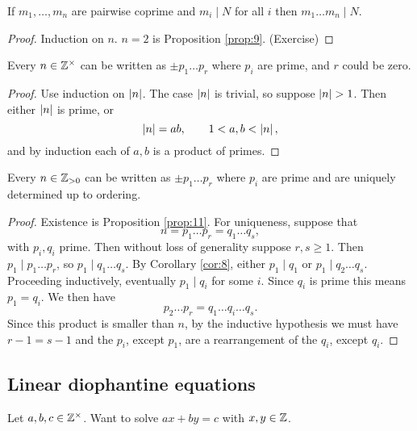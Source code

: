 \begin{corollary}
\label{cor:10}
If $ m_1, \dots, m_n $ are pairwise coprime and $ m_i \mid N $ for all $ i $ then $ m_1 \dots m_n \mid N $.
\end{corollary}

\begin{proof}
Induction on $ n $. $ n = 2 $ is Proposition \ref{prop:9}. (Exercise)
\end{proof}

\begin{proposition}
\label{prop:11}
Every $ n \in \mathbb{Z}^\times $ can be written as $ \pm p_1 \dots p_r $ where $ p_i $ are prime, and $ r $ could be zero.
\end{proposition}

\begin{proof}
Use induction on $ \left\lvert n \right\rvert $. The case $ \left\lvert n \right\rvert $ is trivial, so suppose $ \left\lvert n \right\rvert > 1 $. Then either $ \left\lvert n \right\rvert $ is prime, or
$$ \left\lvert n \right\rvert = ab, \qquad 1 < a, b < \left\lvert n \right\rvert, $$
and by induction each of $ a, b $ is a product of primes.
\end{proof}

\begin{theorem}
Every $ n \in \mathbb{Z}_{> 0} $ can be written as $ \pm p_1 \dots p_r $ where $ p_i $ are prime and are uniquely determined up to ordering.
\end{theorem}

\begin{proof}
Existence is Proposition \ref{prop:11}. For uniqueness, suppose that
$$ n = p_1 \dots p_r = q_1 \dots q_s, $$
with $ p_i, q_i $ prime. Then without loss of generality suppose $ r, s \ge 1 $. Then $ p_1 \mid p_1 \dots p_r $, so $ p_1 \mid q_1 \dots q_s $. By Corollary \ref{cor:8}, either $ p_1 \mid q_1 $ or $ p_1 \mid q_2 \dots q_s $. Proceeding inductively, eventually $ p_1 \mid q_i $ for some $ i $. Since $ q_i $ is prime this means $ p_1 = q_i $. We then have
$$ p_2 \dots p_r = q_1 \dots q_i \dots q_s. $$
Since this product is smaller than $ n $, by the inductive hypothesis we must have $ r - 1 = s - 1 $ and the $ p_i $, except $ p_1 $, are a rearrangement of the $ q_i $, except $ q_i $.
\end{proof}

\subsection{Linear diophantine equations}

Let $ a, b, c \in \mathbb{Z}^\times $. Want to solve $ ax + by = c $ with $ x, y \in \mathbb{Z} $.

